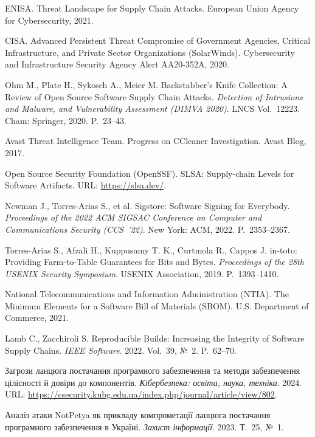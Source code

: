 
 ENISA. Threat Landscape for Supply Chain Attacks. European Union Agency for Cybersecurity, 2021.

 CISA. Advanced Persistent Threat Compromise of Government Agencies, Critical Infrastructure, and Private Sector Organizations (SolarWinds). Cybersecurity and Infrastructure Security Agency Alert AA20-352A, 2020.

 Ohm M., Plate H., Sykosch A., Meier M. Backstabber's Knife Collection: A Review of Open Source Software Supply Chain Attacks. \emph{Detection of Intrusions and Malware, and Vulnerability Assessment (DIMVA 2020)}. LNCS Vol.~12223. Cham: Springer, 2020. P.~23--43.

 Avast Threat Intelligence Team. Progress on CCleaner Investigation. Avast Blog, 2017.

 Open Source Security Foundation (OpenSSF). SLSA: Supply-chain Levels for Software Artifacts. URL: \url{https://slsa.dev/}.

 Newman J., Torres-Arias S., et al. Sigstore: Software Signing for Everybody. \emph{Proceedings of the 2022 ACM SIGSAC Conference on Computer and Communications Security (CCS~'22)}. New York: ACM, 2022. P.~2353--2367.

 Torres-Arias S., Afzali H., Kuppusamy T. K., Curtmola R., Cappos J. in-toto: Providing Farm-to-Table Guarantees for Bits and Bytes. \emph{Proceedings of the 28th USENIX Security Symposium}. USENIX Association, 2019. P.~1393--1410.

 National Telecommunications and Information Administration (NTIA). The Minimum Elements for a Software Bill of Materials (SBOM). U.S. Department of Commerce, 2021.

 Lamb C., Zacchiroli S. Reproducible Builds: Increasing the Integrity of Software Supply Chains. \emph{IEEE Software}. 2022. Vol.~39, №~2. P.~62--70.

 Загрози ланцюга постачання програмного забезпечення та методи забезпечення цілісності й довіри до компонентів. \emph{Кібербезпека: освіта, наука, техніка}. 2024. URL: \url{https://csecurity.kubg.edu.ua/index.php/journal/article/view/802}.

 Аналіз атаки NotPetya як прикладу компрометації ланцюга постачання програмного забезпечення в Україні. \emph{Захист інформації}. 2023. Т.~25, №~1.
